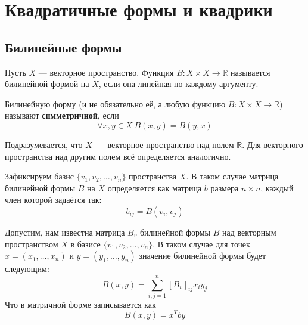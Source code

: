 \documentclass[11pt]{article}
\begin{document}
    \section{Квадратичные формы и квадрики}
    \subsection{Билинейные формы}

    \begin{definition}
    Пусть $X$ --- векторное пространство. Функция $B: X \times X \to \mathbb{R}$ называется билинейной формой на $X$, если она линейная по каждому аргументу.
    \end{definition}

    \begin{remark}
    Билинейную форму (и не обязательно её, а любую функцию $B: X \times X \to \mathbb{R}$) называют \textbf{симметричной}, если
    \begin{equation*}
        \forall x, y \in X \ B(x, y) = B(y, x)
    \end{equation*}
    \end{remark}

    \begin{remark}
    Подразумевается, что $X$~--- векторное пространство над полем $\mathbb{R}$. Для векторного пространства над другим полем всё определяется аналогично.
    \end{remark}

    \begin{definition}
    Зафиксируем базис $\{v_1, v_2, \hdots, v_n\}$ пространства $X$. В таком случае матрица билинейной формы $B$ на $X$ определяется как матрица $b$ размера $n \times n$, каждый член которой задаётся так:
    \begin{equation*}
        b_{ij} = B(v_i, v_j)
    \end{equation*}
    \end{definition}

    \begin{remark}
    Допустим, нам известна матрица $B_{v}$ билинейной формы $B$ над векторным пространством $X$ в базисе $\{v_1, v_2, \hdots, v_n\}$. В таком случае для точек $x = (x_1, \hdots, x_n)$ и $y = (y_1, \hdots, y_n)$ значение билинейной формы будет следующим:
    \begin{equation*}
        B(x, y) = \sum_{i, j = 1}^{n} [B_{v}]_{ij} x_i y_j
    \end{equation*}
    Что в матричной форме записывается как
    \begin{equation*}
        B(x, y) = x^{T} b y
    \end{equation*}
    \end{remark}
\end{document}
